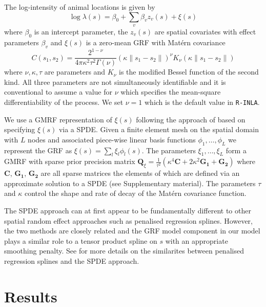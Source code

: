 \documentclass[preprint,12pt]{elsarticle}
\newcommand{\bm}{\boldsymbol}  %
\begin{document}
The log-intensity of animal locations is given by
\begin{equation*}
\log \lambda(s) = \beta_0 + \sum_v \beta_v z_v(s) + \xi(s)
\end{equation*}
where $\beta_0$ is an intercept parameter, the $z_v(s)$ are spatial covariates with effect parameters $\beta_v$ and $\xi(s)$ is a zero-mean GRF with Mat\'ern covariance
\begin{equation}
C(s_1,s_2) = \frac{2^{1-\nu}}{4\pi\kappa^2\tau^2\Gamma(\nu)}(\kappa \|s_1-s_2\|)^{\nu}K_\nu(\kappa \|s_1-s_2\|)
\end{equation}
where \(\nu, \kappa, \tau\) are parameters and \(K_{\nu}\) is the modified Bessel function of the second kind.  All three parameters are not simultaneously identifiable \citep{zhang_inconsistent_2004} and it is conventional to assume a value for $\nu$ which specifies the mean-square differentiability of the process.  We set $\nu = 1$ which is the default value in \texttt{R-INLA}.

We use a GMRF representation of $\xi(s)$ following the approach of \cite{lindgren_explicit_2011} based on specifying $\xi(s)$ via a SPDE.  Given a finite element mesh on the spatial domain with $L$ nodes and associated piece-wise linear basis functions $\phi_1, \ldots, \phi_L$ we represent the GRF as $\xi(s) = \sum_l \xi_l \phi_l(s)$.  The parameters $\xi_1, \ldots, \xi_L$ form a GMRF with sparse prior precision matrix $\bm{Q}_{\xi} = \frac{1}{\tau^2}\left(\kappa^4\bm{C} + 2\kappa^2\bm{G_1} + \bm{G_2}\right)$ where $\bm{C}$, $\bm{G_1}$, $\bm{G_2}$ are all sparse matrices the elements of which are defined via an approximate solution to a SPDE (see Supplementary material). The parameters $\tau$ and $\kappa$ control the shape and rate of decay of the Mat\'ern covariance function. 

The SPDE approach can at first appear to be fundamentally different to other spatial random effect approaches such as penalised regression splines.  However, the two methods are closely related and the GRF model component in our model plays a similar role to a tensor product spline on $s$ with an appropriate smoothing penalty.  See \cite{yue_bayesian_2014, miller_understanding_2019} for more details on the similarites between penalised regression splines and the SPDE approach.  

\section{Results}
\label{results}
\end{document}
